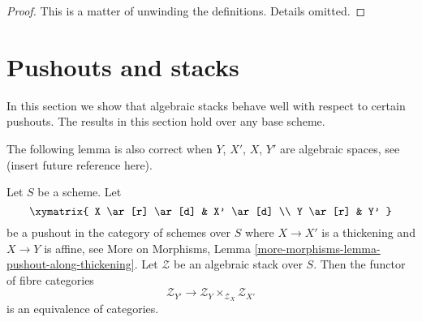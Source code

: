 \begin{proof}
This is a matter of unwinding the definitions. Details omitted.
\end{proof}




\section{Pushouts and stacks}
\label{section-pushouts}

\noindent
In this section we show that algebraic stacks behave well with
respect to certain pushouts. The results in this section hold over
any base scheme.

\medskip\noindent
The following lemma is also correct when $Y$, $X'$, $X$, $Y'$ are
algebraic spaces, see (insert future reference here).

\begin{lemma}
\label{lemma-pushout}
Let $S$ be a scheme. Let
$$
\xymatrix{
X \ar[r] \ar[d] & X' \ar[d] \\
Y \ar[r] & Y'
}
$$
be a pushout in the category of schemes over $S$ where $X \to X'$
is a thickening and $X \to Y$ is affine, see
More on Morphisms, Lemma \ref{more-morphisms-lemma-pushout-along-thickening}.
Let $\mathcal{Z}$ be an algebraic stack over $S$.
Then the functor of fibre categories
$$
\mathcal{Z}_{Y'}
\longrightarrow
\mathcal{Z}_Y \times_{\mathcal{Z}_X} \mathcal{Z}_{X'}
$$
is an equivalence of categories.
\end{lemma}

